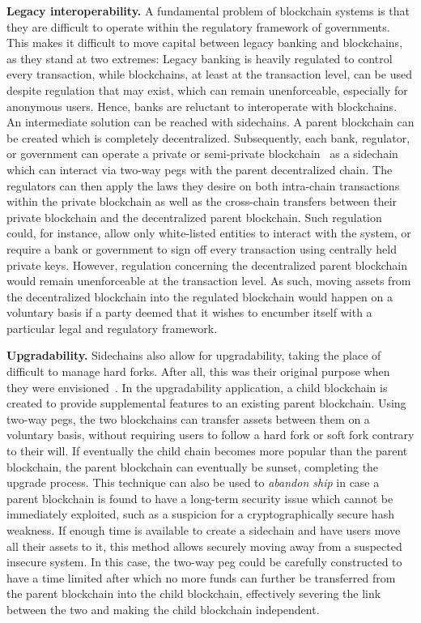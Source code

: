 \noindent
\textbf{Legacy interoperability. } A fundamental problem of blockchain systems
is that they are difficult to operate within the regulatory framework of
governments. This makes it difficult to move capital between legacy banking and
blockchains, as they stand at two extremes: Legacy banking is heavily regulated
to control every transaction, while blockchains, at least at the transaction
level, can be used despite regulation that may exist, which can remain
unenforceable, especially for anonymous users. Hence, banks are reluctant to
interoperate with blockchains. An intermediate solution can be reached with
sidechains. A parent blockchain can be created which is completely
decentralized. Subsequently, each bank, regulator, or government can operate a
private or semi-private blockchain~\cite{danezis2015centrally} as a sidechain
which can interact via two-way pegs with the parent decentralized chain. The
regulators can then apply the laws they desire on both intra-chain transactions
within the private blockchain as well as the cross-chain transfers between their
private blockchain and the decentralized parent blockchain. Such regulation
could, for instance, allow only white-listed entities to interact with the
system, or require a bank or government to sign off every transaction using
centrally held private keys. However, regulation concerning the decentralized
parent blockchain would remain unenforceable at the transaction level. As such,
moving assets from the decentralized blockchain into the regulated blockchain
would happen on a voluntary basis if a party deemed that it wishes to encumber
itself with a particular legal and regulatory framework.

\noindent
\textbf{Upgradability. } Sidechains also allow for upgradability, taking the
place of difficult to manage hard forks. After all, this was their original
purpose when they were envisioned~\cite{sidechains}. In the upgradability
application, a child blockchain is created to provide supplemental features to
an existing parent blockchain. Using two-way pegs, the two blockchains can
transfer assets between them on a voluntary basis, without requiring users to
follow a hard fork or soft fork contrary to their will. If eventually the child
chain becomes more popular than the parent blockchain, the parent blockchain can
eventually be sunset, completing the upgrade process. This technique can also be
used to \emph{abandon ship} in case a parent blockchain is found to have a
long-term security issue which cannot be immediately exploited, such as a
suspicion for a cryptographically secure hash weakness. If enough time is
available to create a sidechain and have users move all their assets to it, this
method allows securely moving away from a suspected insecure system. In this
case, the two-way peg could be carefully constructed to have a time limited
after which no more funds can further be transferred from the parent blockchain
into the child blockchain, effectively severing the link between the two and
making the child blockchain independent.

